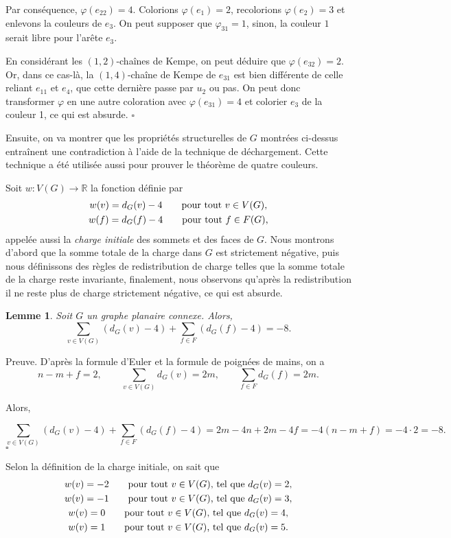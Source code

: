 \documentclass[10pt,a4paper]{article}
\newtheorem{lemme}{Lemme}
\newcommand{\ep}{{\hfill $\square$}}
\begin{document}
Par conséquence, $\varphi(e_{22}) = 4$. Colorions $\varphi(e_1)=2$, recolorions $\varphi(e_2)=3$ et enlevons la couleurs de $e_3$.
On peut supposer que $\varphi_{31}=1$, sinon, la couleur $1$ serait libre pour l'arête $e_3$.

En considérant les $(1,2)$-chaînes de Kempe, on peut déduire que $\varphi(e_{32})=2$. Or, dans ce cas-là, la $(1,4)$-chaîne de Kempe de $e_{31}$ est bien différente de celle reliant $e_{11}$ et $e_4$, que cette dernière passe par $u_2$ ou pas. On peut donc transformer $\varphi$ en une autre coloration avec $\varphi(e_{31})=4$ et colorier $e_3$ de la couleur 1, ce qui est absurde.
\ep


\bigskip
Ensuite, on va montrer que les propriétés structurelles de $G$ montrées ci-dessus entraînent une contradiction à l'aide de la technique de déchargement. Cette technique a été utilisée aussi pour prouver le théorème de quatre couleurs. 

Soit $w: V(G) \to \mathbb{R}$  la fonction définie par
 $$
 \gathered
 w(v) = d_G(v) - 4 \qquad \textrm{pour tout $v\in V(G)$,} \\
 w(f) = d_G(f) - 4 \qquad \textrm{pour tout $f\in F(G)$,} 
\endgathered 
$$
appelée aussi la \emph{charge initiale} des sommets et des faces de $G$. Nous montrons d'abord que la somme totale de la charge dans $G$ est strictement négative, puis nous définissons des règles de redistribution de charge telles que la somme totale de la charge reste invariante, finalement, nous observons qu'après la redistribution il ne reste plus de charge strictement négative, ce qui est absurde.

\begin{lemme}
Soit $G$ un graphe planaire connexe. Alors,
$$ \sum_{v \in V(G)} (d_G(v) - 4) + \sum_{f\in F} (d_G(f) -4) = -8.$$
\label{le:charge}
\end{lemme}

Preuve.
D'après la formule d'Euler et la formule de poignées de mains, on a
$$ 
n - m + f = 2, \qquad
\sum_{v\in V(G)} d_G(v) = 2m, \qquad
\sum_{f\in F} d_G(f) = 2m. 
$$

Alors,

$$ \sum_{v \in V(G)} (d_G(v) - 4) + \sum_{f\in F} (d_G(f) -4) = 2m -4n + 2m - 4f = -4(n - m + f) = -4\cdot 2 = -8.$$
\ep 

Selon la définition de la charge initiale, on sait que
$$ 
\gathered
w(v) = -2 \qquad \textrm{pour tout $v \in V(G)$, tel que } d_G(v) = 2, \\
w(v) = -1 \qquad \textrm{pour tout $v \in V(G)$, tel que } d_G(v) = 3, \\
w(v) =  0 \qquad \textrm{pour tout $v \in V(G)$, tel que } d_G(v) = 4, \\
w(v) =  1 \qquad \textrm{pour tout $v \in V(G)$, tel que } d_G(v) = 5.
\endgathered
$$
\end{document}

